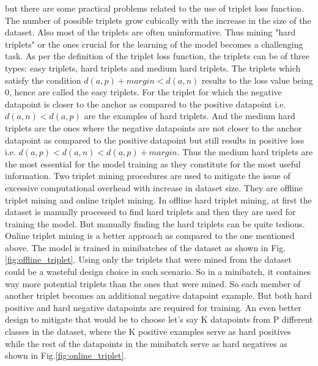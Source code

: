 but there are some practical problems related to the use of triplet loss function. The number of possible triplets grow cubically with the increase in the size of the dataset. Also most of the triplets are often uninformative. Thus mining "hard triplets" or the ones crucial for the learning of the model becomes a challenging task. As per the definition of the triplet loss function, the triplets can be of three types: easy triplets, hard triplets and medium hard triplets. The triplets which satisfy the condition $d(a,p)+margin<d(a,n)$ results to the loss value being 0, hence are called the easy triplets.\cite*{triplet_loss} For the triplet for which the negative datapoint is closer to the anchor as compared to the positive datapoint i.e. $d(a,n)<d(a,p)$ are the examples of hard triplets.\cite*{triplet_loss} And the medium hard triplets are the ones where the negative datapoints are not closer to the anchor datapoint as compared to the positive datapoint but still results in positive loss i.e. $d(a,p)<d(a,n)<d(a,p)+margin$.\cite*{triplet_loss} Thus the medium hard triplets are the most essential for the model training as they constitute for the most useful information. Two triplet mining procedures are used to mitigate the issue of excessive computational overhead with increase in dataset size. They are offline triplet mining and online triplet mining. In offline hard triplet mining, at first the dataset is manually processed to find hard triplets and then they are used for training the model. But manually finding the hard triplets can be quite tedious. Online triplet mining is a better approach as compared to the one mentioned above. The model is trained in minibatches of the dataset as shown in Fig.\ref*{fig:offline_triplet}. Using only the triplets that were mined from the dataset could be a wasteful design choice in such scenario. So in a minibatch, it containes way more potential triplets than the ones that were mined. So each member of another triplet becomes an additional negative datapoint example. But both hard positive and hard negative datapoints are required for training. An even better design to mitigate that would be to choose let's say K datapoints from P different classes in the dataset, where the K positive examples serve as hard positives while the rest of the datapoints in the minibatch serve as hard negatives as shown in Fig.\ref*{fig:online_triplet}\cite*{hermans2017defense}.
